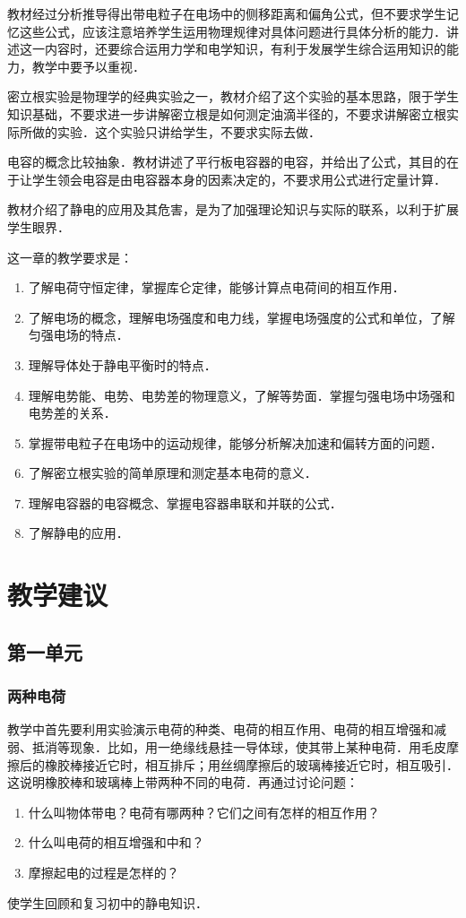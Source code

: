 教材经过分析推导得出带电粒子在电场中的侧移距离和偏角公式，但不要求学生记忆这些公式，应该注意培养学生运用物理规律对具体问题进行具体分析的能力．讲述这一内容时，还要综合运用力学和电学知识，有利于发展学生综合运用知识的能力，教学中要予以重视．

密立根实验是物理学的经典实验之一，教材介绍了这个实验的基本思路，限于学生知识基础，不要求进一步讲解密立根是如何测定油滴半径的，不要求讲解密立根实际所做的实验．这个实验只讲给学生，不要求实际去做．

电容的概念比较抽象．教材讲述了平行板电容器的电容，并给出了公式，其目的在于让学生领会电容是由电容器本身的因素决定的，不要求用公式进行定量计算．

教材介绍了静电的应用及其危害，是为了加强理论知识与实际的联系，以利于扩展学生眼界．

这一章的教学要求是：
\begin{enumerate}
\item 了解电荷守恒定律，掌握库仑定律，能够计算点电荷间的相互作用．
\item 了解电场的概念，理解电场强度和电力线，掌握电场强度的公式和单位，了解匀强电场的特点．
\item 理解导体处于静电平衡时的特点．
\item 理解电势能、电势、电势差的物理意义，了解等势面．掌握匀强电场中场强和电势差的关系．
\item 掌握带电粒子在电场中的运动规律，能够分析解决加速和偏转方面的问题．
\item 了解密立根实验的简单原理和测定基本电荷的意义．
\item 理解电容器的电容概念、掌握电容器串联和并联的公式．
\item 了解静电的应用．
\end{enumerate}

\section{教学建议}
\subsection{第一单元}
\subsubsection{两种电荷}

教学中首先要利用实验演示电荷的种类、电荷的相互作用、电荷的相互增强和减弱、抵消等现象．比如，用一绝缘线悬挂一导体球，使其带上某种电荷．用毛皮摩擦后的橡胶棒接近它时，相互排斥；用丝绸摩擦后的玻璃棒接近它时，相互吸引．这说明橡胶棒和玻璃棒上带两种不同的电荷．再通过讨论问题：
\begin{enumerate}
    \item 什么叫物体带电？电荷有哪两种？它们之间有怎样的相互作用？
    \item 什么叫电荷的相互增强和中和？
    \item 摩擦起电的过程是怎样的？
\end{enumerate}
使学生回顾和复习初中的静电知识．

